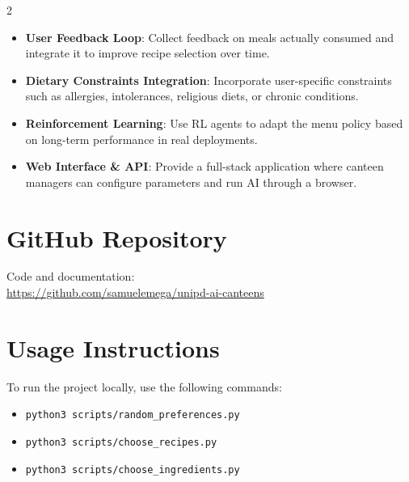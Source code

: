\documentclass[10pt,a4paper]{article}
\begin{document}
\begin{multicols}{2}
\begin{itemize}[leftmargin=*]
  \item \textbf{User Feedback Loop}: Collect feedback on meals actually consumed and integrate it to improve recipe selection over time.
  \item \textbf{Dietary Constraints Integration}: Incorporate user-specific constraints such as allergies, intolerances, religious diets, or chronic conditions.
  \item \textbf{Reinforcement Learning}: Use RL agents to adapt the menu policy based on long-term performance in real deployments.
  \item \textbf{Web Interface \& API}: Provide a full-stack application where canteen managers can configure parameters and run AI through a browser.
\end{itemize}

\section*{GitHub Repository}
Code and documentation: \\ \url{https://github.com/samuelemega/unipd-ai-canteens}

\section*{Usage Instructions}
To run the project locally, use the following commands:

\begin{itemize}[leftmargin=*]
  \item \texttt{python3 scripts/random\_preferences.py}
  \item \texttt{python3 scripts/choose\_recipes.py}
  \item \texttt{python3 scripts/choose\_ingredients.py}
\end{itemize}

\end{multicols}
\end{document}
